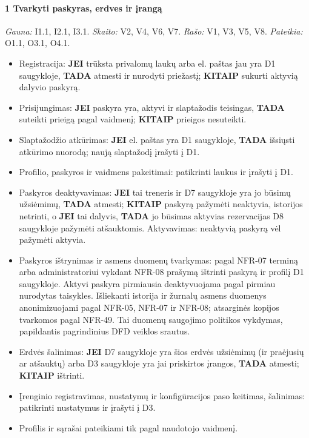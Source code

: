 \paragraph{1 Tvarkyti paskyras, erdves ir įrangą}\mbox{}\par
{\small \textit{Gauna:} I1.1, I2.1, I3.1. \textit{Skaito:} V2, V4, V6, V7. \textit{Rašo:} V1, V3, V5, V8. \textit{Pateikia:} O1.1, O3.1, O4.1.}
\begin{itemize}
  \item Registracija: \textbf{JEI} trūksta privalomų laukų arba el. paštas jau yra D1 saugykloje, \textbf{TADA} atmesti ir nurodyti priežastį; \textbf{KITAIP} sukurti aktyvią dalyvio paskyrą.
  \item Prisijungimas: \textbf{JEI} paskyra yra, aktyvi ir slaptažodis teisingas, \textbf{TADA} suteikti prieigą pagal vaidmenį; \textbf{KITAIP} prieigos nesuteikti.
  \item Slaptažodžio atkūrimas: \textbf{JEI} el. paštas yra D1 saugykloje, \textbf{TADA} išsiųsti atkūrimo nuorodą; naują slaptažodį įrašyti į D1.
  \item Profilio, paskyros ir vaidmens pakeitimai: patikrinti laukus ir įrašyti į D1.
  \item Paskyros deaktyvavimas: \textbf{JEI} tai treneris ir D7 saugykloje yra jo būsimų užsiėmimų, \textbf{TADA} atmesti; \textbf{KITAIP} paskyrą pažymėti neaktyvia, istorijos netrinti, o \textbf{JEI} tai dalyvis, \textbf{TADA} jo būsimas aktyvias rezervacijas D8 saugykloje pažymėti atšauktomis. Aktyvavimas: neaktyvią paskyrą vėl pažymėti aktyvia.
  \item Paskyros ištrynimas ir asmens duomenų tvarkymas: pagal NFR-07 terminą arba administratoriui vykdant NFR-08 prašymą ištrinti paskyrą ir profilį D1 saugykloje. Aktyvi paskyra pirmiausia deaktyvuojama pagal pirmiau nurodytas taisykles. Išliekanti istorija ir žurnalų asmens duomenys anonimizuojami pagal NFR-05, NFR-07 ir NFR-08; atsarginės kopijos tvarkomos pagal NFR-49. Tai duomenų saugojimo politikos vykdymas, papildantis pagrindinius DFD veiklos srautus.
  \item Erdvės šalinimas: \textbf{JEI} D7 saugykloje yra šios erdvės užsiėmimų (ir praėjusių ar atšauktų) arba D3 saugykloje yra jai priskirtos įrangos, \textbf{TADA} atmesti; \textbf{KITAIP} ištrinti.
  \item Įrenginio registravimas, nustatymų ir konfigūracijos paso keitimas, šalinimas: patikrinti nustatymus ir įrašyti į D3.
  \item Profilis ir sąrašai pateikiami tik pagal naudotojo vaidmenį.
\end{itemize}
